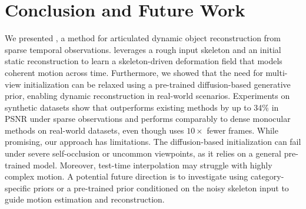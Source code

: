 \section{Conclusion and Future Work}
\label{dyn_sec:conclusion}

We presented \ourmethod, a method for articulated dynamic object reconstruction from sparse temporal observations. \ourmethod{} leverages a rough input skeleton and an initial static reconstruction to learn a skeleton-driven deformation field that models coherent motion across time.
Furthermore, we showed that the need for multi-view initialization can be relaxed using a pre-trained diffusion-based generative prior, enabling dynamic reconstruction in real-world scenarios.
Experiments on synthetic datasets show that \ourmethod{} outperforms existing methods by up to 34\% in PSNR under sparse observations and performs comparably to dense monocular methods on real-world datasets, even though \ourmethod{} uses $10\times$ fewer frames. %
While promising, our approach has limitations. The diffusion-based initialization can fail under severe self-occlusion or uncommon viewpoints, as it relies on a general pre-trained model. 
Moreover, test-time interpolation may struggle with highly complex motion. 
A potential future direction is to investigate using  category-specific priors or a pre-trained prior conditioned on the noisy skeleton input to guide motion estimation and reconstruction.
 
